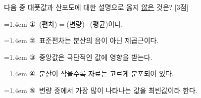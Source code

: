 다음 중 대푯값과 산포도에 대한 설명으로 옳지 \underline{않은} 것은? \mbox{[3점]}
\par\medskip\par\noindent\hangindent=1.4em {\small ①}\ (편차)$=$(변량)$-$(평균)이다.\par\noindent\hangindent=1.4em {\small ②}\ 표준편차는 분산의 음이 아닌 제곱근이다.\par\noindent\hangindent=1.4em {\small ③}\ 중앙값은 극단적인 값에 영향을 받는다.\par\noindent\hangindent=1.4em {\small ④}\ 분산이 작을수록 자료는 고르게 분포되어 있다.\par\noindent\hangindent=1.4em {\small ⑤}\ 변량 중에서 가장 많이 나타나는 값을 최빈값이라 한다.\par\medskip
